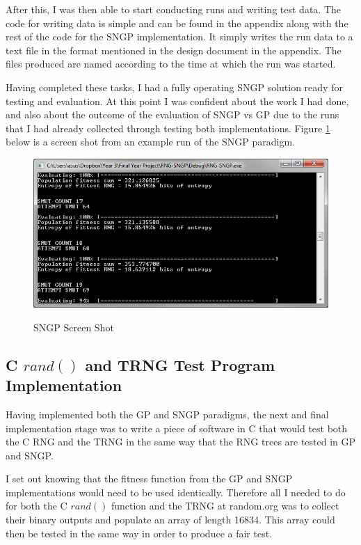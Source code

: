 \documentclass[a4paper,10.5pt]{article}
\begin{document}
After this, I was then able to start conducting runs and writing test data. The code for writing data is simple and can be found in the appendix along with the rest of the code for the SNGP implementation. It simply writes the run data to a text file in the format mentioned in the design document in the appendix. The files produced are named according to the time at which the run was started.

Having completed these tasks, I had a fully operating SNGP solution ready for testing and evaluation. At this point I was confident about the work I had done, and also about the outcome of the evaluation of SNGP vs GP due to the runs that I had already collected through testing both implementations. Figure \ref{sngpss} below is a screen shot from an example run of the SNGP paradigm.

\begin{figure}[H]
\centering
\caption{SNGP Screen Shot}
\includegraphics[scale = 0.75]{sngp-ss.png}
\label{sngpss}
\end{figure}

\subsection{C $rand()$ and TRNG Test Program Implementation}
Having implemented both the GP and SNGP paradigms, the next and final implementation stage was to write a piece of software in C that would test both the C RNG and the TRNG in the same way that the RNG trees are tested in GP and SNGP.

I set out knowing that the fitness function from the GP and SNGP implementations would need to be used identically. Therefore all I needed to do for both the C $rand()$ function and the TRNG at random.org was to collect their binary outputs and populate an array of length 16834. This array could then be tested in the same way in order to produce a fair test.
\end{document}
